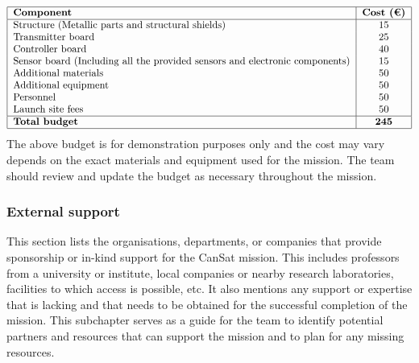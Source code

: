 \documentclass[11pt]{article}
\begin{document}
\[
\begin{tabular}{|l|c|}
\hline
\textbf{Component} & \textbf{Cost (€)} \\
\hline
Structure (Metallic parts and structural shields) & 15 \\
Transmitter board & 25 \\
Controller board & 40 \\
Sensor board (Including all the provided sensors and electronic components) & 15 \\
Additional materials & 50 \\
Additional equipment & 50 \\
Personnel & 50 \\
Launch site fees & 50 \\
\hline
\textbf{Total budget} & \textbf{245} \\
\hline
\end{tabular}
\]
The above budget is for demonstration purposes only and the cost may vary depends on the exact materials and equipment used for the mission. The team should review and update the budget as necessary throughout the mission.

\subsubsection{External support}
This section lists the organisations, departments, or companies that provide sponsorship or in-kind support for the CanSat mission. This includes professors from a university or institute, local companies or nearby research laboratories, facilities to which access is possible, etc. It also mentions any support or expertise that is lacking and that needs to be obtained for the successful completion of the mission. This subchapter serves as a guide for the team to identify potential partners and resources that can support the mission and to plan for any missing resources.
\end{document}
